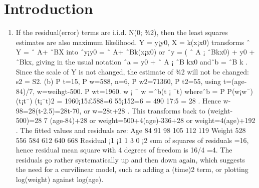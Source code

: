 \documentclass{article}
\begin{document}
\maketitle

\section{Introduction}
\begin{enumerate}
    \item If the residual(error) terms are i.i.d. N(0; ¾2), then the least squares estimates are also maximum
likelihood. Y = y¡y0, X = k(x¡x0) transforms ˆ Y = ˆ A+ ˆBX into ˆy¡y0 = ˆ A+ ˆBk(x¡x0)
or ˆy = ( ˆ A ¡ ˆBkx0) + y0 + ˆBkx, giving in the usual notation ˆa = y0 + ˆ A ¡ ˆB kx0 andˆb = ˆB k .
Since the scale of Y is not changed, the estimate of ¾2 will not be changed: s2 = S2.
(b)
P
t=15,
P
w=588, n=6,
P
w2=71360,
P
t2=55, using t=(age-84)/7, w=weihgt-500.
P
wt=1960.
w ¡ ¯ w =ˆb(t ¡ ¯t) whereˆb =
P
P(w¡w¯)(t¡t¯)
(t¡¯t)2
= 1960¡15£588=6
55¡152=6
= 490
17:5 = 28
.
Hence w-98=28(t-2.5)=28t-70, or w=28t+28 .
This transforms back to (weight-500)=28
7 (age-84)+28
or weight=500+4(age)-336+28 or weight=4(age)+192 .
The fitted values and residuals are:
Age 84 91 98 105 112 119
Weight 528 556 584 612 640 668
Residual ¡1 ¡1 1 3 0 ¡2
sum of squares of residuals =16, hence residual mean square with 4 degrees of freedom is 16/4
=4.
The residuals go rather systematically up and then down again, which suggests the need for
a curvilinear model, such as adding a (time)2 term, or plotting log(weight) against log(age).
\end{enumerate}
\end{document}
